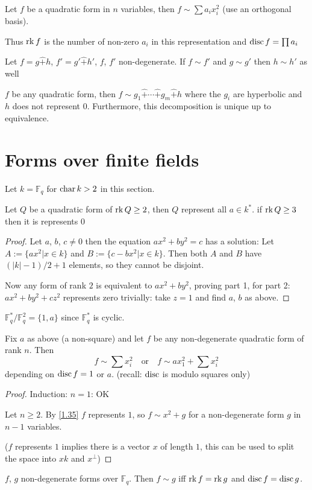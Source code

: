 \begin{korollar}
  Let $f$ be a quadratic form in $n$ variables, then $f\sim \sum a_i x_i^2$
  (use an orthogonal basis).

  Thus $\mathop{\rm rk}\nolimits f$ is the number of non-zero $a_i$ in this representation and
  $\mathop{\rm disc}\nolimits f = \prod a_i$
\end{korollar}

\begin{korollar}
  Let $f = g\hat + h$, $f' = g' \hat + h'$, $f$, $f'$ non-degenerate.
  If $f\sim f'$ and $g\sim g'$ then $h \sim h'$ as well
\end{korollar}

\begin{korollar}
  $f$ be any quadratic form, then $f\sim g_1 \hat + \cdots \hat + g_m \hat + h$ where the $g_i$ are hyperbolic and $h$ does not represent $0$.
  Furthermore, this decomposition is unique up to equivalence.
\end{korollar}

\section{Forms over finite fields}
Let $k = \mathbb F_q$ for $\mathop{\rm char}\nolimits k>2$ in this section.

\begin{proposition}\label{1.35}
  Let $Q$ be a quadratic form of $\mathop{\rm rk}\nolimits Q\ge 2$, then $Q$ represent
  all $a\in k^*$. if $\mathop{\rm rk}\nolimits Q\ge 3$ then it is represents $0$
\end{proposition}
\begin{proof}
  Let $a$, $b$, $c\ne 0$ then the equation $ax^2+by^2=c$ has a
  solution:
  Let $A := \{ax^2 | x \in k\}$ and $B := \{c-bx^2|x \in k\}$. Then
  both $A$ and $B$ have $(|k|-1)/2 +1$ elements, so they cannot be
  disjoint.

  Now any form of rank $2$ is equivalent to $ax^2+by^2$, proving part
  1, for part 2: $ax^2+by^2+cz^2$ represents zero trivially: take $z=1$
  and find $a$, $b$ as above.
\end{proof}

\begin{remark}
  $\mathbb F_q^*/\mathbb F_q^2 = \{1, a\}$ since $\mathbb F_q^*$ is cyclic.
\end{remark}

\begin{proposition}
  Fix $a$ as above (a non-square) and let $f$ be any non-degenerate quadratic
  form of rank $n$. Then
  $$f\sim \sum x_i^2\quad\text{or}\quad f\sim ax_1^2 + \sum x_i^2$$
  depending on $\mathop{\rm disc}\nolimits f = 1$ or $a$.
  (recall: $\mathop{\rm disc}\nolimits$ is modulo squares only)
\end{proposition}
\begin{proof}
  Induction: $n=1$: OK
  
  Let $n\ge 2$. By \ref{1.35} $f$ represents $1$, so $f \sim x^2 + g$
  for a non-degenerate form $g$ in $n-1$ variables.

  ($f$ represents $1$ implies there is a vector $x$ of length $1$, this can be
  used to split the space into $xk$ and $x^\perp$)
\end{proof}

\begin{korollar}
  $f$, $g$ non-degenerate forms over $\mathbb F_q$. Then
  $f\sim g$ iff $\mathop{\rm rk}\nolimits f = \mathop{\rm rk}\nolimits g$ and $\mathop{\rm disc}\nolimits f = \mathop{\rm disc}\nolimits g$.
\end{korollar}

